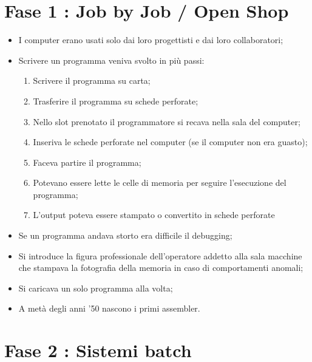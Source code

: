 \section{Fase 1 : Job by Job / Open Shop}
\begin{itemize}
    \item I computer erano usati solo dai loro progettisti e dai loro collaboratori;
    \item Scrivere un programma veniva svolto in più passi:
    \begin{enumerate}
        \item Scrivere il programma su carta;
        \item Trasferire il programma su schede perforate;
        \item Nello slot prenotato il programmatore si recava nella sala del computer;
        \item Inseriva le schede perforate nel computer (se il computer non era guasto);
        \item Faceva partire il programma;
        \item Potevano essere lette le celle di memoria per seguire l'esecuzione del programma;
        \item L'output poteva essere stampato o convertito in schede perforate
    \end{enumerate}
    \item Se un programma andava storto era difficile il debugging;
    \item Si introduce la figura professionale dell'operatore addetto alla sala macchine
    che stampava la fotografia della memoria in caso di comportamenti anomali;
    \item Si caricava un solo programma alla volta;
    \item A metà degli anni '50 nascono i primi assembler.
\end{itemize}

\section{Fase 2 : Sistemi batch}


